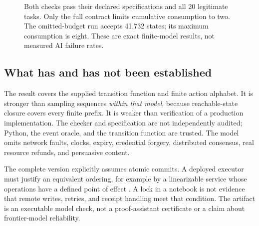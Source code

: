 \documentclass[10pt,twocolumn,letterpaper]{article}
\begin{document}
\begin{figure}[t]
\centering
{}
\caption{Both checks pass their declared specifications and all 20 legitimate tasks. Only the full contract limits cumulative consumption to two. The omitted-budget run accepts 41,732 states; its maximum consumption is eight. These are exact finite-model results, not measured AI failure rates.}
\label{fig:omission}
\end{figure}

\subsection{What has and has not been established}
The result covers the supplied transition function and finite action alphabet. It is stronger than sampling sequences \emph{within that model}, because reachable-state closure covers every finite prefix. It is weaker than verification of a production implementation. The checker and specification are not independently audited; Python, the event oracle, and the transition function are trusted. The model omits network faults, clocks, expiry, credential forgery, distributed consensus, real resource refunds, and persuasive content.

The complete version explicitly assumes atomic commits. A deployed executor must justify an equivalent ordering, for example by a linearizable service whose operations have a defined point of effect \cite{linearizability}. A lock in a notebook is not evidence that remote writes, retries, and receipt handling meet that condition. The artifact is an executable model check, not a proof-assistant certificate or a claim about frontier-model reliability.
\end{document}
